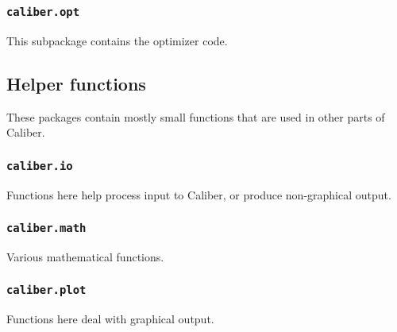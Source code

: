\subsubsection{\texttt{caliber.opt}}
This subpackage contains the optimizer code.

\subsection{Helper functions}
These packages contain mostly small functions that are used in other parts of Caliber.
\subsubsection{\texttt{caliber.io}}
Functions here help process input to Caliber, or produce non-graphical output.
\subsubsection{\texttt{caliber.math}}
Various mathematical functions.
\subsubsection{\texttt{caliber.plot}}
Functions here deal with graphical output.

